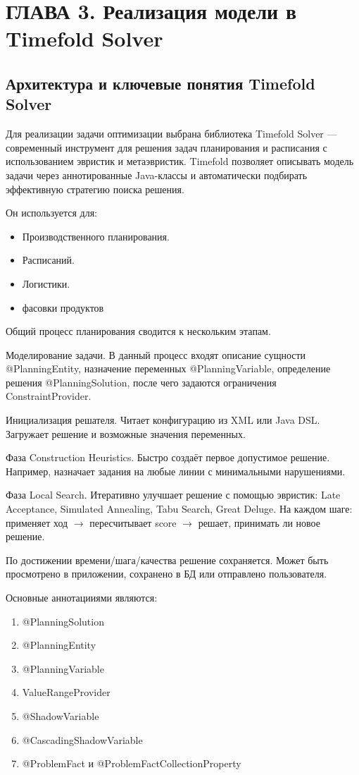 \chapter{ ГЛАВА 3. Реализация модели в Timefold Solver}
\label{ch:chapter3}

\section{Архитектура и ключевые понятия Timefold Solver}

Для реализации задачи оптимизации выбрана библиотека Timefold Solver — современный инструмент для решения задач планирования и расписания с использованием эвристик и метаэвристик. Timefold позволяет описывать модель задачи через аннотированные Java-классы и автоматически подбирать эффективную стратегию поиска решения.

Он используется для:
\begin{itemize}
    \item Производственного планирования.
    \item Расписаний.
    \item Логистики.
    \item фасовки продуктов
\end{itemize}

Общий процесс планирования сводится к нескольким этапам.

Моделирование задачи. В данный процесс входят описание сущности @PlanningEntity, назначение переменных @PlanningVariable, определение решения @PlanningSolution, после чего задаются ограничения ConstraintProvider.

Инициализация решателя. Читает конфигурацию из XML или Java DSL. Загружает решение и возможные значения переменных.

Фаза Construction Heuristics. Быстро создаёт первое допустимое решение. Например, назначает задания на любые линии с минимальными нарушениями.

Фаза Local Search. Итеративно улучшает решение с помощью эвристик: Late Acceptance, Simulated Annealing, Tabu Search, Great Deluge. На каждом шаге: применяет ход $\rightarrow$ пересчитывает score $\rightarrow$ решает, принимать ли новое решение.
 
По достижении времени/шага/качества решение сохраняется. Может быть просмотрено в приложении, сохранено в БД или отправлено пользователя.

Основные аннотацииями являются:

\begin{enumerate}
    \item @PlanningSolution
    \item @PlanningEntity
    \item @PlanningVariable
    \item ValueRangeProvider
    \item @ShadowVariable
    \item @CascadingShadowVariable
    \item @ProblemFact и @ProblemFactCollectionProperty
\end{enumerate}

